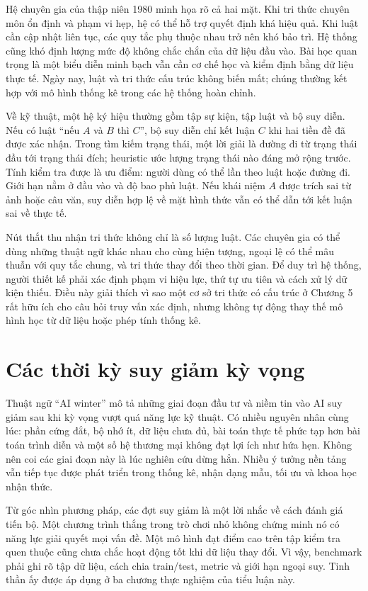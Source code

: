\documentclass[12pt,a4paper]{report}
\begin{document}
Hệ chuyên gia của thập niên 1980 minh họa rõ cả hai mặt. Khi tri thức chuyên môn ổn định và phạm vi hẹp, hệ có thể hỗ trợ quyết định khá hiệu quả. Khi luật cần cập nhật liên tục, các quy tắc phụ thuộc nhau trở nên khó bảo trì. Hệ thống cũng khó định lượng mức độ không chắc chắn của dữ liệu đầu vào. Bài học quan trọng là một biểu diễn minh bạch vẫn cần cơ chế học và kiểm định bằng dữ liệu thực tế. Ngày nay, luật và tri thức cấu trúc không biến mất; chúng thường kết hợp với mô hình thống kê trong các hệ thống hoàn chỉnh.

Về kỹ thuật, một hệ ký hiệu thường gồm tập sự kiện, tập luật và bộ suy diễn. Nếu có luật ``nếu $A$ và $B$ thì $C$'', bộ suy diễn chỉ kết luận $C$ khi hai tiền đề đã được xác nhận. Trong tìm kiếm trạng thái, một lời giải là đường đi từ trạng thái đầu tới trạng thái đích; heuristic ước lượng trạng thái nào đáng mở rộng trước. Tính kiểm tra được là ưu điểm: người dùng có thể lần theo luật hoặc đường đi. Giới hạn nằm ở đầu vào và độ bao phủ luật. Nếu khái niệm $A$ được trích sai từ ảnh hoặc câu văn, suy diễn hợp lệ về mặt hình thức vẫn có thể dẫn tới kết luận sai về thực tế.

Nút thắt thu nhận tri thức không chỉ là số lượng luật. Các chuyên gia có thể dùng những thuật ngữ khác nhau cho cùng hiện tượng, ngoại lệ có thể mâu thuẫn với quy tắc chung, và tri thức thay đổi theo thời gian. Để duy trì hệ thống, người thiết kế phải xác định phạm vi hiệu lực, thứ tự ưu tiên và cách xử lý dữ kiện thiếu. Điều này giải thích vì sao một cơ sở tri thức có cấu trúc ở Chương 5 rất hữu ích cho câu hỏi truy vấn xác định, nhưng không tự động thay thế mô hình học từ dữ liệu hoặc phép tính thống kê.

\section{Các thời kỳ suy giảm kỳ vọng}
Thuật ngữ ``AI winter'' mô tả những giai đoạn đầu tư và niềm tin vào AI suy giảm sau khi kỳ vọng vượt quá năng lực kỹ thuật. Có nhiều nguyên nhân cùng lúc: phần cứng đắt, bộ nhớ ít, dữ liệu chưa đủ, bài toán thực tế phức tạp hơn bài toán trình diễn và một số hệ thương mại không đạt lợi ích như hứa hẹn. Không nên coi các giai đoạn này là lúc nghiên cứu dừng hẳn. Nhiều ý tưởng nền tảng vẫn tiếp tục được phát triển trong thống kê, nhận dạng mẫu, tối ưu và khoa học nhận thức.

Từ góc nhìn phương pháp, các đợt suy giảm là một lời nhắc về cách đánh giá tiến bộ. Một chương trình thắng trong trò chơi nhỏ không chứng minh nó có năng lực giải quyết mọi vấn đề. Một mô hình đạt điểm cao trên tập kiểm tra quen thuộc cũng chưa chắc hoạt động tốt khi dữ liệu thay đổi. Vì vậy, benchmark phải ghi rõ tập dữ liệu, cách chia train/test, metric và giới hạn ngoại suy. Tinh thần ấy được áp dụng ở ba chương thực nghiệm của tiểu luận này.
\end{document}
